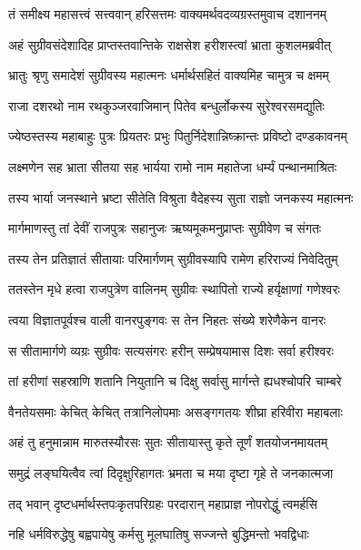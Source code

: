
\twolineshloka
{तं समीक्ष्य महासत्त्वं सत्त्ववान् हरिसत्तमः}
{वाक्यमर्थवदव्यग्रस्तमुवाच दशाननम्} %

\twolineshloka
{अहं सुग्रीवसंदेशादिह प्राप्तस्तवान्तिके}
{राक्षसेश हरीशस्त्वां भ्राता कुशलमब्रवीत्} %

\twolineshloka
{भ्रातुः श्रृणु समादेशं सुग्रीवस्य महात्मनः}
{धर्मार्थसहितं वाक्यमिह चामुत्र च क्षमम्} %

\twolineshloka
{राजा दशरथो नाम रथकुञ्जरवाजिमान्}
{पितेव बन्धुर्लोकस्य सुरेश्वरसमद्युतिः} %

\twolineshloka
{ज्येष्ठस्तस्य महाबाहुः पुत्रः प्रियतरः प्रभुः}
{पितुर्निदेशान्निष्क्रान्तः प्रविष्टो दण्डकावनम्} %

\twolineshloka
{लक्ष्मणेन सह भ्राता सीतया सह भार्यया}
{रामो नाम महातेजा धर्म्यं पन्थानमाश्रितः} %

\twolineshloka
{तस्य भार्या जनस्थाने भ्रष्टा सीतेति विश्रुता}
{वैदेहस्य सुता राज्ञो जनकस्य महात्मनः} %

\twolineshloka
{मार्गमाणस्तु तां देवीं राजपुत्रः सहानुजः}
{ऋष्यमूकमनुप्राप्तः सुग्रीवेण च संगतः} %

\twolineshloka
{तस्य तेन प्रतिज्ञातं सीतायाः परिमार्गणम्}
{सुग्रीवस्यापि रामेण हरिराज्यं निवेदितुम्} %

\twolineshloka
{ततस्तेन मृधे हत्वा राजपुत्रेण वालिनम्}
{सुग्रीवः स्थापितो राज्ये हर्यृक्षाणां गणेश्वरः} %

\twolineshloka
{त्वया विज्ञातपूर्वश्च वाली वानरपुङ्गवः}
{स तेन निहतः संख्ये शरेणैकेन वानरः} %

\twolineshloka
{स सीतामार्गणे व्यग्रः सुग्रीवः सत्यसंगरः}
{हरीन् सम्प्रेषयामास दिशः सर्वा हरीश्वरः} %

\twolineshloka
{तां हरीणां सहस्राणि शतानि नियुतानि च}
{दिक्षु सर्वासु मार्गन्ते ह्यधश्चोपरि चाम्बरे} %

\twolineshloka
{वैनतेयसमाः केचित् केचित् तत्रानिलोपमाः}
{असङ्गगतयः शीघ्रा हरिवीरा महाबलाः} %

\twolineshloka
{अहं तु हनुमान्नाम मारुतस्यौरसः सुतः}
{सीतायास्तु कृते तूर्णं शतयोजनमायतम्} %

\twolineshloka
{समुद्रं लङ्घयित्वैव त्वां दिदृक्षुरिहागतः}
{भ्रमता च मया दृष्टा गृहे ते जनकात्मजा} %

\twolineshloka
{तद् भवान् दृष्टधर्मार्थस्तपःकृतपरिग्रहः}
{परदारान् महाप्राज्ञ नोपरोद्धुं त्वमर्हसि} %

\twolineshloka
{नहि धर्मविरुद्धेषु बह्वपायेषु कर्मसु}
{मूलघातिषु सज्जन्ते बुद्धिमन्तो भवद्विधाः} %

